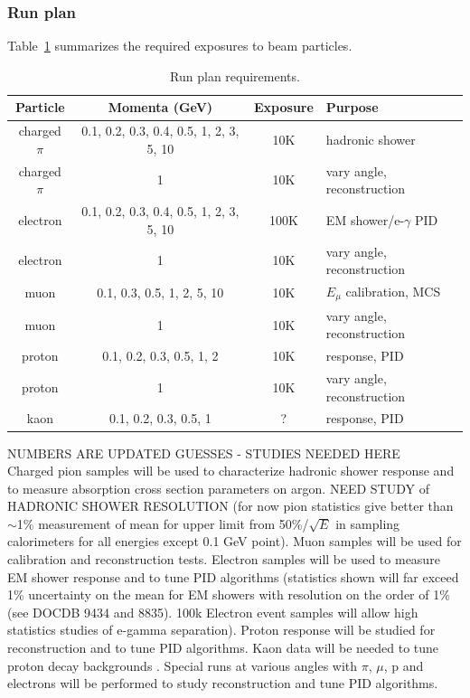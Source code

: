\clearpage
\subsubsection {Run plan}

Table~\ref{tab:runplan} summarizes the required exposures to beam particles.
\begin{table}[h]
\centering
\begin{tabular}{|c|c|c|l|}
\hline
Particle & Momenta (GeV) & Exposure & Purpose \\ \hline
charged $\pi$       & 0.1, 0.2, 0.3, 0.4, 0.5, 1, 2, 3, 5, 10     &  10K  & hadronic shower \\ \hline
charged $\pi$ &  1  &  10K  & vary angle, reconstruction \\ \hline
electron       &    0.1, 0.2, 0.3, 0.4, 0.5, 1, 2, 3, 5, 10        &    100K   & EM shower/e-$\gamma$ PID     \\ \hline
electron &  1  &  10K  & vary angle, reconstruction \\ \hline
muon &   0.1, 0.3, 0.5, 1, 2, 5, 10  &  10K & $E_\mu$ calibration, MCS \\ \hline
muon &  1  &  10K  & vary angle, reconstruction \\ \hline
proton & 0.1, 0.2, 0.3, 0.5, 1, 2   &  10K & response, PID \\ \hline
proton &  1  &  10K & vary angle, reconstruction \\ \hline
kaon  & 0.1, 0.2, 0.3, 0.5, 1 & ?   &   response, PID  \\ \hline
\end{tabular}
\caption{Run plan requirements.}
\label{tab:runplan}
\end{table}

NUMBERS ARE UPDATED GUESSES - STUDIES NEEDED HERE \\
Charged pion samples will be used to characterize hadronic shower response and to measure
absorption cross section parameters on argon. NEED STUDY of HADRONIC SHOWER RESOLUTION
(for now pion statistics give better than $\sim$1\% measurement of mean for upper limit from 50\%/$\sqrt{E}$ in sampling calorimeters
for all energies except 0.1 GeV point). 
Muon samples will be used for calibration and 
reconstruction tests. Electron samples will be used to measure EM shower response  
and to tune PID algorithms (statistics shown will far exceed 1\% uncertainty on the mean for 
EM showers with resolution on the order of 1\% (see DOCDB 9434 and 8835). 100k Electron event samples will allow
high statistics studies of e-gamma separation).  
Proton response will be studied for reconstruction and to tune PID 
algorithms. Kaon data will be needed to tune proton decay backgrounds .
Special runs at various angles with $\pi$, $\mu$, p and electrons will be performed to study reconstruction and tune PID algorithms. 


